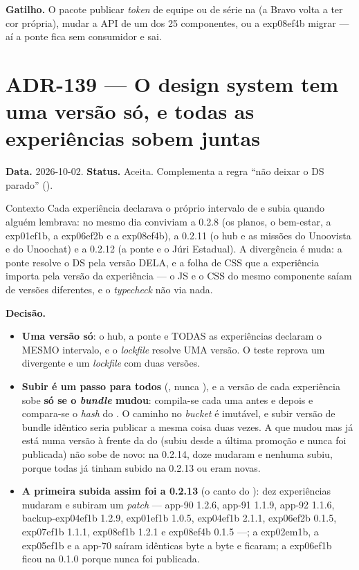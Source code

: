 \textbf{Gatilho.} O pacote publicar \emph{token} de equipe ou de série na
 (a Bravo volta a ter cor própria), mudar a API de um dos 25
componentes, ou a exp08ef4b migrar --- aí a ponte  fica
sem consumidor e sai.

\section{ADR-139 --- O design system tem uma versão só, e todas as experiências sobem juntas}
\label{adr:ds-versao-unica}

\textbf{Data.} 2026-10-02. \textbf{Status.} Aceita. Complementa a regra
``não deixar o DS parado'' ().

\begin{especificacao}{Contexto}
Cada experiência declarava o próprio intervalo de 
e subia quando alguém lembrava: no mesmo dia conviviam a 0.2.8 (os planos, o
bem-estar, a exp01ef1b, a exp06ef2b e a exp08ef4b), a 0.2.11 (o hub e as
missões do Unoovista e do Unoochat) e a 0.2.12 (a ponte e o Júri Estadual). A
divergência é muda: a ponte  resolve o DS pela versão DELA, e
a folha de CSS que a experiência importa pela versão da experiência --- o JS e
o CSS do mesmo componente saíam de versões diferentes, e o \emph{typecheck}
não via nada.
\end{especificacao}

\textbf{Decisão.}

\begin{itemize}
  \item \textbf{Uma versão só}: o hub, a ponte  e TODAS as
    experiências declaram o MESMO intervalo, e o \emph{lockfile} resolve UMA
    versão. O teste 
    reprova um  divergente e um \emph{lockfile} com duas
    versões.
  \item \textbf{Subir é um passo para todos}
    (, nunca
    ), e a versão de cada experiência sobe \textbf{só se o
    \emph{bundle} mudou}: compila-se cada uma antes e depois e compara-se o
    \emph{hash} do . O caminho no \emph{bucket} é imutável, e subir
    versão de bundle idêntico seria publicar a mesma coisa duas vezes. A que
    mudou mas já está numa versão à frente da do  (subiu desde a
    última promoção e nunca foi publicada) não sobe de novo: na 0.2.14, doze
    mudaram e nenhuma subiu, porque todas já tinham subido na 0.2.13 ou eram
    novas.
  \item \textbf{A primeira subida assim foi a 0.2.13} (o canto do
    ): dez experiências mudaram e subiram um \emph{patch} ---
    app-90 1.2.6, app-91 1.1.9, app-92 1.1.6, backup-exp04ef1b 1.2.9,
    exp01ef1b 1.0.5, exp04ef1b 2.1.1, exp06ef2b 0.1.5, exp07ef1b 1.1.1,
    exp08ef1b 1.2.1 e exp08ef4b 0.1.5 ---; a exp02em1b, a exp05ef1b e a app-70
    saíram idênticas byte a byte e ficaram; a exp06ef1b ficou na 0.1.0 porque
    nunca foi publicada.
\end{itemize}


